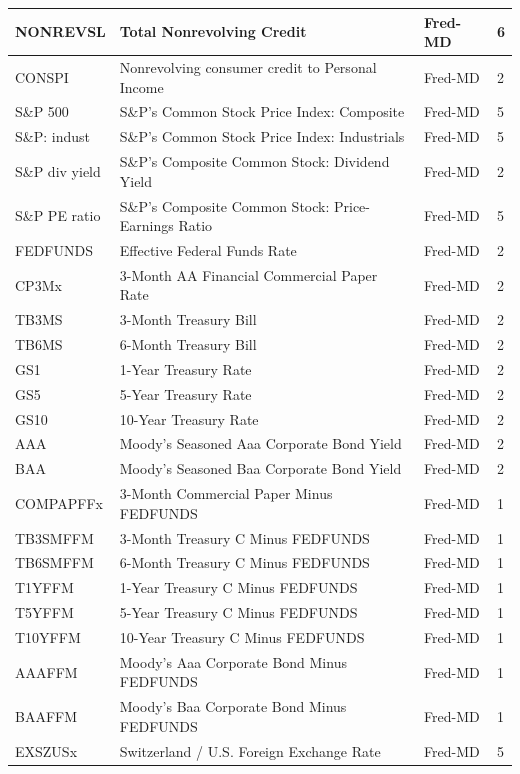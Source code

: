 \documentclass[11pt]{article}
\theoremstyle{plain}
\theoremstyle{definition}
\theoremstyle{remark}
\numberwithin{equation}{section}
\begin{document}
{\begin{longtable}{|l|l|l|l|}
NONREVSL & Total Nonrevolving Credit & Fred-MD & 6 \\ \hline
CONSPI & Nonrevolving consumer credit to Personal Income & Fred-MD & 2 \\ \hline
S\&P 500 & S\&P’s Common Stock Price Index: Composite & Fred-MD & 5 \\ \hline
S\&P: indust & S\&P’s Common Stock Price Index: Industrials & Fred-MD & 5 \\ \hline
S\&P div yield & S\&P’s Composite Common Stock: Dividend Yield & Fred-MD & 2 \\ \hline
S\&P PE ratio & S\&P’s Composite Common Stock: Price-Earnings Ratio & Fred-MD & 5 \\ \hline
FEDFUNDS & Effective Federal Funds Rate & Fred-MD & 2 \\ \hline
CP3Mx & 3-Month AA Financial Commercial Paper Rate & Fred-MD & 2 \\ \hline
TB3MS & 3-Month Treasury Bill & Fred-MD & 2 \\ \hline
TB6MS & 6-Month Treasury Bill & Fred-MD & 2 \\ \hline
GS1 & 1-Year Treasury Rate & Fred-MD & 2 \\ \hline
GS5 & 5-Year Treasury Rate & Fred-MD & 2 \\ \hline
GS10 & 10-Year Treasury Rate & Fred-MD & 2 \\ \hline
AAA & Moody’s Seasoned Aaa Corporate Bond Yield & Fred-MD & 2 \\ \hline
BAA & Moody’s Seasoned Baa Corporate Bond Yield & Fred-MD & 2 \\ \hline
COMPAPFFx & 3-Month Commercial Paper Minus FEDFUNDS & Fred-MD & 1 \\ \hline
TB3SMFFM & 3-Month Treasury C Minus FEDFUNDS & Fred-MD & 1 \\ \hline
TB6SMFFM & 6-Month Treasury C Minus FEDFUNDS & Fred-MD & 1 \\ \hline
T1YFFM & 1-Year Treasury C Minus FEDFUNDS & Fred-MD & 1 \\ \hline
T5YFFM & 5-Year Treasury C Minus FEDFUNDS & Fred-MD & 1 \\ \hline
T10YFFM & 10-Year Treasury C Minus FEDFUNDS & Fred-MD & 1 \\ \hline
AAAFFM & Moody’s Aaa Corporate Bond Minus FEDFUNDS & Fred-MD & 1 \\ \hline
BAAFFM & Moody’s Baa Corporate Bond Minus FEDFUNDS & Fred-MD & 1 \\ \hline
EXSZUSx & Switzerland / U.S. Foreign Exchange Rate & Fred-MD & 5 \\ \hline

\end{longtable}}
\end{document}
